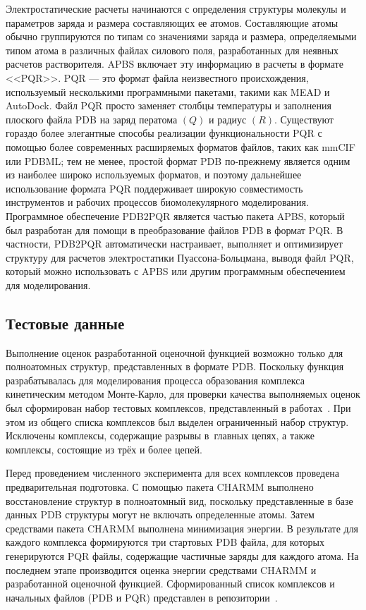 Электростатические расчеты начинаются с определения структуры молекулы и параметров заряда и размера составляющих ее атомов. Составляющие атомы обычно группируются по типам со значениями заряда и размера, определяемыми типом атома в различных файлах силового поля, разработанных для неявных расчетов растворителя. APBS включает эту информацию в расчеты в формате <<PQR>>. PQR — это формат файла неизвестного происхождения, используемый несколькими программными пакетами, такими как MEAD и AutoDock. Файл PQR просто заменяет столбцы температуры и заполнения плоского файла PDB на заряд ператома $(Q)$ и радиус $(R)$. Существуют гораздо более элегантные способы реализации функциональности PQR с помощью более современных расширяемых форматов файлов, таких как mmCIF или PDBML; тем не менее, простой формат PDB по-прежнему является одним из наиболее широко используемых форматов, и поэтому дальнейшее использование формата PQR поддерживает широкую совместимость инструментов и рабочих процессов биомолекулярного моделирования. Программное обеспечение PDB2PQR является частью пакета APBS, который был разработан для помощи в преобразование файлов PDB в формат PQR. В частности, PDB2PQR автоматически настраивает, выполняет и оптимизирует структуру для расчетов электростатики Пуассона-Больцмана, выводя файл PQR, который можно использовать с APBS или другим программным обеспечением для моделирования.


\subsection{Тестовые данные}


Выполнение оценок разработанной оценочной функцией возможно только для полноатомных структур, представленных в формате PDB. Поскольку функция разрабатывалась для моделирования процесса образования комплекса кинетическим методом Монте-Карло, для проверки качества выполняемых оценок был сформирован набор тестовых комплексов, представленный в работах~\cite{biom10071056, rate}. При этом из общего списка комплексов был выделен ограниченный набор структур. Исключены комплексы, содержащие разрывы в~главных цепях, а также комплексы, состоящие из трёх и более цепей. 

Перед проведением численного эксперимента для всех комплексов проведена предварительная подготовка. С помощью пакета CHARMM выполнено восстановление структур в полноатомный вид, поскольку представленные в базе данных PDB структуры могут не включать определенные атомы. Затем средствами пакета CHARMM выполнена минимизация энергии. В результате для каждого комплекса формируются три стартовых PDB файла, для которых генерируются PQR файлы, содержащие частичные заряды для каждого атома. На последнем этапе производится оценка энергии средствами CHARMM и разработанной оценочной функцией. Сформированный список комплексов и начальных файлов (PDB и PQR) представлен в репозитории~\cite{vcs}.